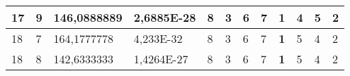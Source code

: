 \documentclass[conference]{IEEEtran}
\begin{document}
\begin{table*}[]
\begin{tabular}{|llll|llllllll|}
\multicolumn{1}{|l|}{17}                                                             & \multicolumn{1}{l|}{9}                                                                 & \multicolumn{1}{l|}{146,0888889}                                                           & 2,6885E-28                              & \multicolumn{1}{l|}{8}                                                           & \multicolumn{1}{l|}{3}                                                           & \multicolumn{1}{l|}{6}                                                           & \multicolumn{1}{l|}{7}                                                           & \multicolumn{1}{l|}{\textbf{1}}                                                  & \multicolumn{1}{l|}{4}                                                           & \multicolumn{1}{l|}{5}                                                           & 2                                   \\ \hline
\multicolumn{1}{|l|}{18}                                                             & \multicolumn{1}{l|}{7}                                                                 & \multicolumn{1}{l|}{164,1777778}                                                           & 4,233E-32                               & \multicolumn{1}{l|}{8}                                                           & \multicolumn{1}{l|}{3}                                                           & \multicolumn{1}{l|}{6}                                                           & \multicolumn{1}{l|}{7}                                                           & \multicolumn{1}{l|}{\textbf{1}}                                                  & \multicolumn{1}{l|}{5}                                                           & \multicolumn{1}{l|}{4}                                                           & 2                                   \\ \hline
\multicolumn{1}{|l|}{18}                                                             & \multicolumn{1}{l|}{8}                                                                 & \multicolumn{1}{l|}{142,6333333}                                                           & 1,4264E-27                              & \multicolumn{1}{l|}{8}                                                           & \multicolumn{1}{l|}{3}                                                           & \multicolumn{1}{l|}{6}                                                           & \multicolumn{1}{l|}{7}                                                           & \multicolumn{1}{l|}{\textbf{1}}                                                  & \multicolumn{1}{l|}{5}                                                           & \multicolumn{1}{l|}{4}                                                           & 2                                   \\ \hline

\end{tabular}
\end{table*}
\end{document}
